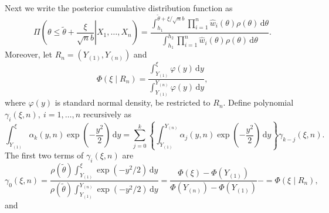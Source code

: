 \documentclass[oneside,english]{amsbook}
\numberwithin{section}{chapter}
\numberwithin{equation}{section}
\numberwithin{figure}{section}
\theoremstyle{plain}
\theoremstyle{plain}
\theoremstyle{definition}
\theoremstyle{plain}
\theoremstyle{plain}
\theoremstyle{remark}
\theoremstyle{definition}
\theoremstyle{definition}
\newcommand{\diff}{\,\mathrm{d}}
\begin{document}
Next we write the posterior cumulative distribution function as 
\[
\Pi\left(\left.\theta\le\tilde{\theta}+\frac{\xi}{\sqrt{n}b}\right|X_{1},\ldots,X_{n}\right)=\frac{\int_{h_{1}}^{\tilde{\theta}+\xi/\sqrt{n}b}\prod_{i=1}^{n}\hat{w}_{i}\left(\theta\right)\rho\left(\theta\right)\diff\theta}{\int_{h_{1}}^{h_{2}}\prod_{i=1}^{n}\hat{w}_{i}\left(\theta\right)\rho\left(\theta\right)\diff\theta}.
\]
Moreover, let $R_{n}=\left(Y_{\left(1\right)},Y_{\left(n\right)}\right)$
and 
\[
\Phi\left(\xi\mid R_{n}\right)=\frac{\int_{Y_{\left(1\right)}}^{\xi}\varphi\left(y\right)\diff y}{\int_{Y_{\left(1\right)}}^{Y_{\left(n\right)}}\varphi\left(y\right)\diff y},
\]
where $\varphi\left(y\right)$ is standard normal density, be restricted
to $R_{n}$. Define polynomial $\gamma_{i}\left(\xi,n\right),\: i=1,\ldots,n$
recursively as 
\[
\int_{Y_{\left(1\right)}}^{\xi}\alpha_{k}\left(y,n\right)\exp\left(-\frac{y^{2}}{2}\right)\diff y=\sum_{j=0}^{k}\left\{ \int_{Y_{\left(1\right)}}^{Y_{\left(n\right)}}\alpha_{j}\left(y,n\right)\exp\left(-\frac{y^{2}}{2}\right)\diff y\right\} \gamma_{k-j}\left(\xi,n\right).
\]
The first two terms of $\gamma_{i}\left(\xi,n\right)$ are
\[
\gamma_{0}\left(\xi,n\right)=\frac{\rho\left(\tilde{\theta}\right)\int_{Y_{\left(1\right)}}^{\xi}\exp\left(-y^{2}/2\right)\diff y}{\rho\left(\tilde{\theta}\right)\int_{Y_{\left(1\right)}}^{Y_{\left(n\right)}}\exp\left(-y^{2}/2\right)\diff y}=\frac{\Phi\left(\xi\right)-\Phi\left(Y_{\left(1\right)}\right)}{\Phi\left(Y_{\left(n\right)}\right)-\Phi\left(Y_{\left(1\right)}\right)}-=\Phi\left(\xi\mid R_{n}\right),
\]
and 
\end{document}
